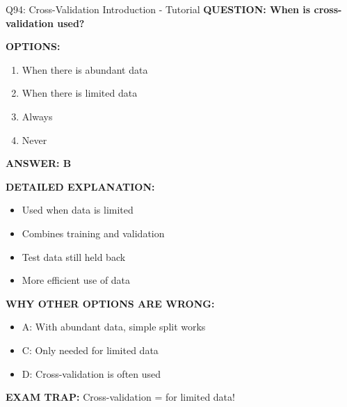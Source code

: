 \documentclass[8pt]{beamer}
\begin{document}
	\begin{frame}{Q94: Cross-Validation Introduction - Tutorial}
		\fontsize{6.5}{7.5}\selectfont
		\textbf{QUESTION: When is cross-validation used?}
		
		\vspace{0.1cm}
		\textbf{OPTIONS:}
		\begin{enumerate}
			\item When there is abundant data
			\item When there is limited data
			\item Always
			\item Never
		\end{enumerate}
		
		\vspace{0.1cm}
		\textcolor{myblue}{\textbf{ANSWER: B}}
		
		\vspace{0.1cm}
		\textbf{DETAILED EXPLANATION:}
		\begin{itemize}
			\item Used when data is limited
			\item Combines training and validation
			\item Test data still held back
			\item More efficient use of data
		\end{itemize}
		
		\vspace{0.1cm}
		\textcolor{myred}{\textbf{WHY OTHER OPTIONS ARE WRONG:}}
		\begin{itemize}
			\item \textcolor{myred}{A:} With abundant data, simple split works
			\item \textcolor{myred}{C:} Only needed for limited data
			\item \textcolor{myred}{D:} Cross-validation is often used
		\end{itemize}
		
		\textcolor{myred}{\textbf{EXAM TRAP:}} Cross-validation = \textcolor{myblue}{for limited data}!
	\end{frame}
	
\end{document}
